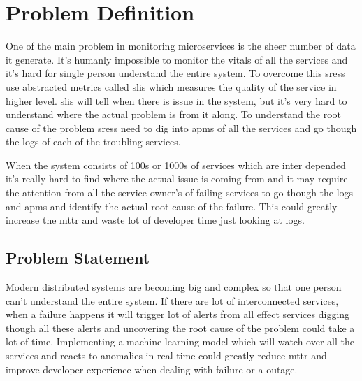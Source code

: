 \section{Problem Definition}

One of the main problem in monitoring microservices is the sheer number of data it generate. It's humanly impossible to monitor the vitals of all the services and it's hard for single person understand the entire system. To overcome this \acp{sres} use abstracted metrics called \acp{sli} which measures the quality of the service in higher level. \acp{sli} will tell when there is issue in the system, but it's very hard to understand where the actual problem is from it along. To understand the root cause of the problem \acp{sres} need to dig into \acp{apm} of all the services and go though the logs of each of the troubling services.

When the system consists of 100s or 1000s of services which are inter depended it's really hard to find where the actual issue is coming from and it may require the attention from all the service owner's of failing services to go though the logs and \acp{apm} and identify the actual root cause of the failure.
This could greatly increase the \ac{mttr} and waste lot of developer time just looking at logs.

\subsection{Problem Statement}

Modern distributed systems are becoming big and complex so that one person can't understand the entire system. If there are lot of interconnected services, when a failure happens it will trigger lot of alerts from all effect services digging though all these alerts and uncovering the root cause of the problem could take a lot of time. Implementing a machine learning model which will watch over all the services and reacts to anomalies in real time could greatly reduce \ac{mttr} and improve developer experience when dealing with failure or a outage.
